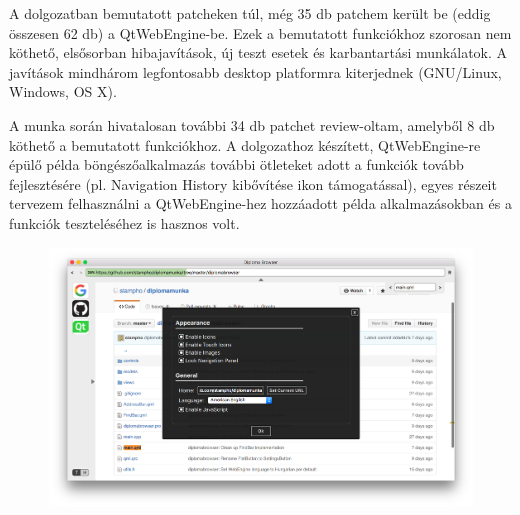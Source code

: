 \documentclass[12pt]{report}
\begin{document}
A dolgozatban bemutatott patcheken túl, még 35 db patchem került be (eddig összesen 62 db) a
QtWebEngine-be. Ezek a bemutatott funkciókhoz szorosan nem köthető, elsősorban hibajavítások,
új teszt esetek és karbantartási munkálatok. A javítások mindhárom legfontosabb desktop
platformra kiterjednek (GNU/Linux, Windows, OS X).

A munka során hivatalosan további 34 db patchet review-oltam, amelyből 8 db köthető a
bemutatott funkciókhoz. A dolgozathoz készített, QtWebEngine-re épülő példa
böngészőalkalmazás további ötleteket adott a funkciók tovább fejlesztésére (pl. Navigation
History kibővítése ikon támogatással), egyes részeit tervezem felhasználni a QtWebEngine-hez
hozzáadott példa alkalmazásokban és a funkciók teszteléséhez is hasznos volt.

\begin{figure}[H]
    \centering
    \includegraphics[scale=0.32]{diplomabrowser-result}
\end{figure}


\end{document}
